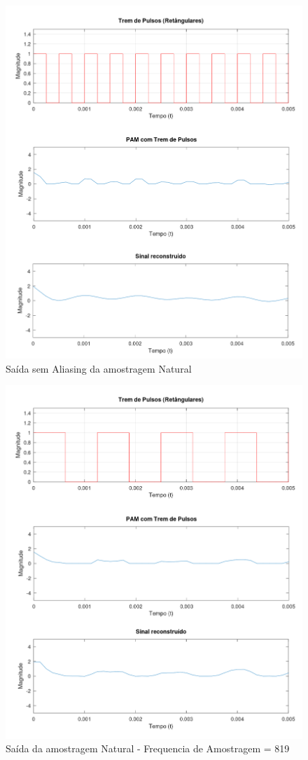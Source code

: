 \begin{figure}[H]
    \centering
    \includegraphics[width=0.8\linewidth]{03_results/octave_results/natural_sampling.png}
    \caption{Saída sem Aliasing da amostragem Natural}
    \label{fig:natural-pam}
\end{figure}

\begin{figure}[H]
    \centering
    \includegraphics[width=0.8\linewidth]{03_results/octave_results/natural_aliasing_sampling.png}
    \caption{Saída da amostragem Natural - Frequencia de Amostragem = 819}
    \label{fig:natural-pam-aliasing}
\end{figure}

